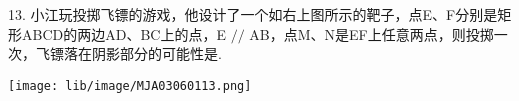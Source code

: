 13. 小江玩投掷飞镖的游戏，他设计了一个如右上图所示的靶子，点E、F分别是矩形ABCD的两边AD、BC上的点，E $//$ AB，点M、N是EF上任意两点，则投掷一次，飞镖落在阴影部分的可能性是\key{\hspace{1cm}}.

\begin{center}

    \texttt{[image: lib/image/MJA03060113.png]}

\end{center}



